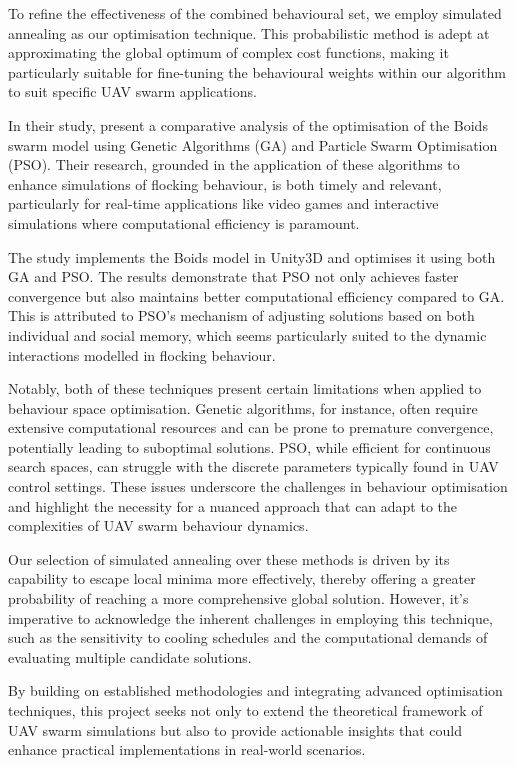 \documentclass[12pt]{article}
\begin{document}
To refine the effectiveness of the combined behavioural set, we employ simulated annealing as our optimisation technique. This probabilistic method is adept at approximating the global optimum of complex cost functions, making it particularly suitable for fine-tuning the behavioural weights within our algorithm to suit specific UAV swarm applications. 

In their study, \citet{Alaliyat2014OptimisationOB} present a comparative analysis of the optimisation of the Boids swarm model using Genetic Algorithms (GA) and Particle Swarm Optimisation (PSO). Their research, grounded in the application of these algorithms to enhance simulations of flocking behaviour, is both timely and relevant, particularly for real-time applications like video games and interactive simulations where computational efficiency is paramount.

The study implements the Boids model in Unity3D and optimises it using both GA and PSO. The results demonstrate that PSO not only achieves faster convergence but also maintains better computational efficiency compared to GA. This is attributed to PSO's mechanism of adjusting solutions based on both individual and social memory, which seems particularly suited to the dynamic interactions modelled in flocking behaviour.

Notably, both of these techniques present certain limitations when applied to behaviour space optimisation. Genetic algorithms, for instance, often require extensive computational resources and can be prone to premature convergence, potentially leading to suboptimal solutions. PSO, while efficient for continuous search spaces, can struggle with the discrete parameters typically found in UAV control settings. These issues underscore the challenges in behaviour optimisation and highlight the necessity for a nuanced approach that can adapt to the complexities of UAV swarm behaviour dynamics.

Our selection of simulated annealing over these methods is driven by its capability to escape local minima more effectively, thereby offering a greater probability of reaching a more comprehensive global solution. However, it's imperative to acknowledge the inherent challenges in employing this technique, such as the sensitivity to cooling schedules and the computational demands of evaluating multiple candidate solutions.

By building on established methodologies and integrating advanced optimisation techniques, this project seeks not only to extend the theoretical framework of UAV swarm simulations but also to provide actionable insights that could enhance practical implementations in real-world scenarios.
\end{document}
